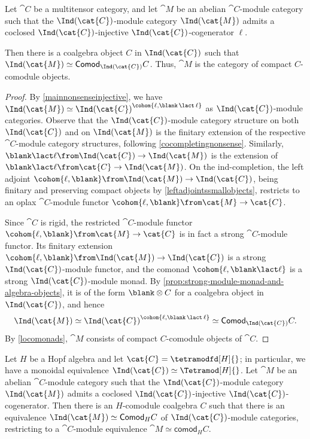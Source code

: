 \begin{theorem}\label{thm:multitensor-ind-reconstruction}
  Let \(\cat{C}\) be a multitensor category,
  and let \(\cat{M}\) be an abelian \(\cat{C}\)\hyp{}module category
  such that the \(\Ind(\cat{C})\)\hyp{}module category \(\Ind(\cat{M})\)
  admits a coclosed \(\Ind(\cat{C})\)\hyp{}injective \(\Ind(\cat{C})\)\hyp{}cogenerator \(\ell\).

  Then there is a coalgebra object \(C\) in \(\Ind(\cat{C})\)
  such that \(\Ind(\cat{M}) \simeq \mathsf{Comod}_{\Ind(\cat{C})}C\).
  Thus, \(\cat{M}\) is the category of compact \(C\)\hyp{}comodule objects.
\end{theorem}
\begin{proof}
  By \cref{mainnonsenseinjective}, we have \(\Ind(\cat{M}) \simeq {\Ind(\cat{C})}^{\cohom{\ell, \blank \,\lact\, \ell}}\)
  as \(\Ind(\cat{C})\)\hyp{}module categories.
  Observe that the \(\Ind(\cat{C})\)\hyp{}module category structure on both \(\Ind(\cat{C})\) and on \(\Ind(\cat{M})\)
  is the finitary extension of the respective \(\cat{C}\)\hyp{}module category structures,
  following \cref{cocompletingnonsense}.
  Similarly, \(\blank \lact \ell\from \Ind(\cat{C}) \to \Ind(\cat{M})\) is the extension of \(\blank \lact \ell\from \cat{C} \to \Ind(\cat{M})\).
  On the ind-completion, the left adjoint \(\cohom{\ell,\blank}\from \Ind(\cat{M}) \to \Ind(\cat{C})\),
  being finitary and preserving compact objects by \cref{leftadjointssmallobjects},
  restricts to an oplax \(\cat{C}\)\hyp{}module functor \(\cohom{\ell,\blank}\from \cat{M} \to \cat{C}\).

  Since \(\cat{C}\) is rigid, the restricted \(\cat{C}\)\hyp{}module functor \(\cohom{\ell,\blank}\from \cat{M} \to \cat{C}\)
  is in fact a strong \(\cat{C}\)\hyp{}module functor.
  Its finitary extension \(\cohom{\ell,\blank}\from \Ind(\cat{M}) \to \Ind(\cat{C})\) is a strong \(\Ind(\cat{C})\)\hyp{}module functor,
  and the comonad \(\cohom{\ell, \blank \lact \ell}\) is a strong \(\Ind(\cat{C})\)\hyp{}module monad.
  By \cref{prop:strong-module-monad-and-algebra-objects},
  it is of the form \(\blank \otimes C\) for a coalgebra object in \(\Ind(\cat{C})\),
  and hence
  \[
    \Ind(\cat{M}) \simeq {\Ind(\cat{C})}^{\cohom{\ell, \blank \,\lact\, \ell}} \simeq \mathsf{Comod}_{\Ind(\cat{C})}C.
  \]
  By \cref{locomonads}, \(\cat{M}\) consists of compact \(C\)\hyp{}comodule objects of \(\cat{C}\).
\end{proof}

\begin{corollary}\label{infinitecomodulecoalgebras}
  Let \(H\) be a Hopf algebra and let \(\cat{C} = \tetramodfd[H]{}\);
  in particular, we have a monoidal equivalence \(\Ind(\cat{C}) \simeq \Tetramod[H]{}\).
  Let \(\cat{M}\) be an abelian \(\cat{C}\)\hyp{}module category
  such that the \(\Ind(\cat{C})\)\hyp{}module category \(\Ind(\cat{M})\)
  admits a coclosed \(\Ind(\cat{C})\)\hyp{}injective \(\Ind(\cat{C})\)\hyp{}cogenerator.
  Then there is an \(H\)\hyp{}comodule coalgebra \(C\)
  such that there is an equivalence \(\Ind(\cat{M}) \simeq \mathsf{Comod}_{H}C\)
  of \(\Ind(\cat{C})\)\hyp{}module categories,
  restricting to a \(\cat{C}\)\hyp{}module equivalence \(\cat{M} \simeq \mathsf{comod}_{H}C\).
\end{corollary}

